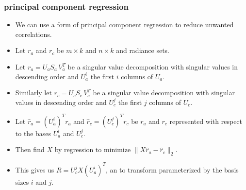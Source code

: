 \documentclass[10pt]{beamer}
\begin{document}
\begin{frame}
\frametitle{principal component regression}
\begin{itemize}

  \item We can use a form of principal component regression to
    reduce unwanted correlations.

  \item Let $r_a$ and $r_c$ be $m \times k$ and $n \times k$ {\airs}
    and {\cris} radiance sets.

  \item Let $r_a = U_a S_a\,V_a^T$ be a singular value decomposition
    with singular values in descending order and $U_a^i$ the first
    $i$ columns of $U_a$.

  \item Similarly let $r_c = U_c S_c\,V_c^T$ be a singular value
    decomposition with singular values in descending order and
    $U_c^j$ the first $j$ columns of $U_c$.

  \item Let $\hat r_a = (U_a^i)^T r_a$ and $\hat r_c = (U_c^j)^T
    r_c$ be $r_a$ and $r_c$ represented with respect to the bases
    $U_a^i$ and $U_c^j$.

  \item Then find $X$ by regression to minimize $\|X \hat r_a - \hat
    r_c\|_2$.

  \item This gives us $R = U_c^j X (U_a^i)^T$, an {\airs} to {\cris}
    transform parameterized by the basis sizes $i$ and $j$.

\end{itemize}
\end{frame}
\end{document}

